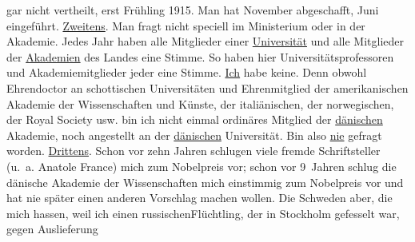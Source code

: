 \begin{ledgroupsized}[t]{13cm}
                    gar nicht vertheilt, erst Frühling 1915. Man hat November
                    abgeschafft, Juni eingeführt.\pend
           \pstart
           {\pb}\uline{Zweitens}. Man fragt nicht speciell im Ministerium oder in der Akademie. Jedes Jahr haben alle Mitglieder
                    einer \uline{Universität} und alle Mitglieder der \uline{Akademien} des Landes eine Stimme. So haben hier
                    Universitätsprofessoren und Akademiemitglieder jeder eine Stimme.\pend
           \pstart
           \uline{Ich} habe keine. Denn obwohl Ehrendoctor an schottischen Universitäten und Ehrenmitglied
                    der amerikanischen Akademie der Wissenschaften und
                        Künste, der italiänischen, der norwegischen, der Royal Society usw.
                    bin ich nicht einmal ordinäres Mitglied der \uline{dänischen} Akademie, noch angestellt an
                    der \uline{dänischen} Universität.\pend
           \pstart
           Bin also \uline{nie} gefragt worden.\pend
           \pstart
           \uline{Drittens}. Schon vor zehn Jahren schlugen viele
                    fremde Schriftsteller (u. a. Anatole France)
                    mich zum Nobelpreis vor; schon vor 9 Jahren
                    schlug {\pb}die dänische Akademie der Wissenschaften mich einstimmig zum Nobelpreis vor und hat nie später einen anderen
                    Vorschlag machen wollen. Die Schweden aber,
                    die mich hassen, weil ich einen russischenFlüchtling, der in Stockholm gefesselt war, gegen Auslieferung

\end{ledgroupsized}
